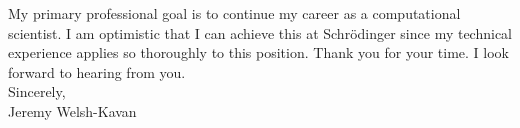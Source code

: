 \documentclass[]{letter}
\begin{document}
My primary professional goal is to continue my career as a computational scientist. I am optimistic that I can achieve this at Schrödinger since my technical experience applies so thoroughly to this position. Thank you for your time. I look forward to hearing from you. \\

Sincerely, \\
Jeremy Welsh-Kavan
\end{document}
